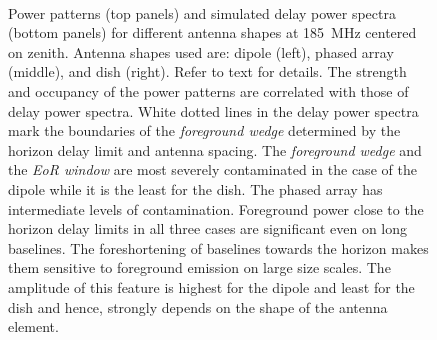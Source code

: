 \documentclass[preprint2,iop,numberedappendix,twocolappendix,appendixfloats]{emulateapj}
\begin{document}
\begin{figure}[htb]
\centering
 \\
\caption{Power patterns (top panels) and simulated delay power spectra (bottom panels) for different antenna shapes at 185~MHz centered on zenith. Antenna shapes used are: dipole (left), phased array (middle), and dish (right). Refer to text for details. The strength and occupancy of the power patterns are correlated with those of delay power spectra. White dotted lines in the delay power spectra mark the boundaries of the {\it foreground wedge} determined by the horizon delay limit and antenna spacing. The {\it foreground wedge} and the {\it EoR window} are most severely contaminated in the case of the dipole while it is the least for the dish. The phased array has intermediate levels of contamination. Foreground power close to the horizon delay limits in all three cases are significant even on long baselines. The foreshortening of baselines towards the horizon makes them sensitive to foreground emission on large size scales. The amplitude of this feature is highest for the dipole and least for the dish and hence, strongly depends on the shape of the antenna element.}
\label{fig:aperture-shapes}
\end{figure}
\end{document}
